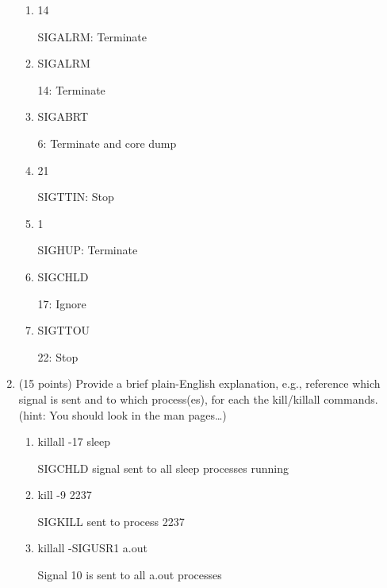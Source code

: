 \documentclass{article}[9pt]
\newenvironment{myanswer}{\begin{mdframed}\begin{answerfont}}{\end{answerfont}\end{mdframed}}
\begin{document}
\begin{enumerate}
\begin{enumerate}
\item 14
\begin{myanswer}
SIGALRM: Terminate
\end{myanswer}

\item SIGALRM
\begin{myanswer}
14: Terminate
\end{myanswer}

\item SIGABRT
\begin{myanswer}
6: Terminate and core dump
\end{myanswer}

\item 21
\begin{myanswer}
SIGTTIN: Stop
\end{myanswer}

\item 1
\begin{myanswer}
SIGHUP: Terminate
\end{myanswer}

\item SIGCHLD
\begin{myanswer}
17: Ignore
\end{myanswer}

\item SIGTTOU
\begin{myanswer}
22: Stop
\end{myanswer}

\end{enumerate}
\item (15 points) Provide a brief plain-English explanation, e.g., reference which
signal is sent and to which process(es), for each the
kill/killall commands. (hint: You should look in the man
pages…)


\begin{enumerate}
\item killall -17 sleep
\begin{myanswer}
SIGCHLD signal sent to all sleep processes running
\end{myanswer}

\item kill -9 2237
\begin{myanswer}
SIGKILL sent to process 2237
\end{myanswer}

\item killall -SIGUSR1 a.out
\begin{myanswer}
Signal 10 is sent to all a.out processes
\end{myanswer}


\end{enumerate}
\end{enumerate}
\end{document}
